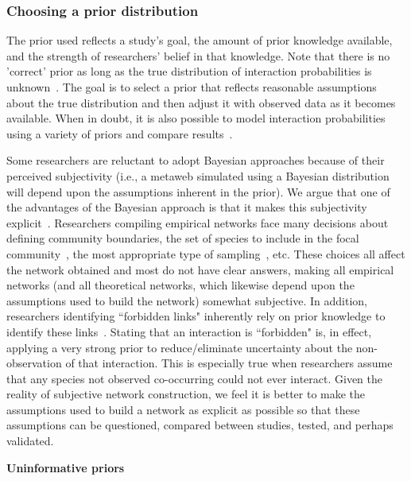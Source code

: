 \documentclass[12pt]{article}
\begin{document}
\begin{spacing}{1.5}
    \subsubsection*{Choosing a prior distribution}  

      The prior used reflects a study's goal, the amount of prior knowledge available, and the strength of researchers' belief in that knowledge. Note that there is no 'correct' prior as long as the true distribution of interaction probabilities is unknown~\citep{Spiegelhalter2000}. The goal is to select a prior that reflects reasonable assumptions about the true distribution and then adjust it with observed data as it becomes available. When in doubt, it is also possible to model interaction probabilities using a variety of priors and compare results~\citep{Spiegelhalter2000}.


      Some researchers are reluctant to adopt Bayesian approaches because of their perceived subjectivity (i.e., a metaweb simulated using a Bayesian distribution will depend upon the assumptions inherent in the prior). We argue that one of the advantages of the Bayesian approach is that it makes this subjectivity explicit~\citep{Spiegelhalter2000}. Researchers compiling empirical networks face many decisions about defining community boundaries, the set of species to include in the focal community~\citep{Jordano2016}, the most appropriate type of sampling~\citep{Wirta2014}, etc. These choices all affect the network obtained and most do not have clear answers, making all empirical networks (and all theoretical networks, which likewise depend upon the assumptions used to build the network) somewhat subjective. In addition, researchers identifying ``forbidden links" inherently rely on prior knowledge to identify these links~\citep{Jordano2016}. Stating that an interaction is ``forbidden" is, in effect, applying a very strong prior to reduce/eliminate uncertainty about the non-observation of that interaction. This is especially true when researchers assume that any species not observed co-occurring could not ever interact. Given the reality of subjective network construction, we feel it is better to make the assumptions used to build a network as explicit as possible so that these assumptions can be questioned, compared between studies, tested, and perhaps validated. 


      \textbf{Uninformative priors}


\end{spacing}
\end{document}
